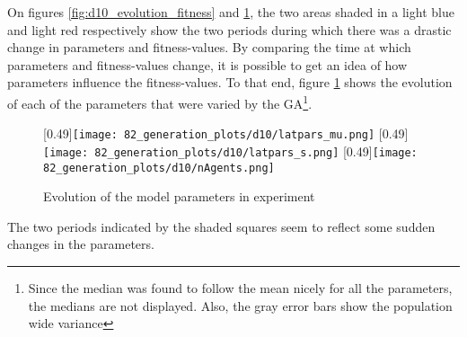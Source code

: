 On figures \ref{fig:d10_evolution_fitness} and \ref{fig:d10_evolution_parameters}, the two areas shaded in a light blue and light red respectively show the two periods during which there was a drastic change in parameters and fitness-values. By comparing the time at which parameters and fitness-values change, it is possible to get an idea of how parameters influence the fitness-values. To that end, figure \ref{fig:d10_evolution_parameters} shows the evolution of each of the parameters that were varied by the GA\footnote{Since the median was found to follow the mean nicely for all the parameters, the medians are not displayed. Also, the gray error bars show the population wide variance}.
\begin{figure}
	\centering
	[0.49\linewidth]{\texttt{[image: 82\_generation\_plots/d10/latpars\_mu.png]}}
	[0.49\linewidth]{\texttt{[image: 82\_generation\_plots/d10/latpars\_s.png]}}
	\vspace{0.5cm}
	[0.49\linewidth]{\texttt{[image: 82\_generation\_plots/d10/nAgents.png]}}
	\caption{Evolution of the model parameters in experiment \dten}
	\label{fig:d10_evolution_parameters}
\end{figure}

The two periods indicated by the shaded squares seem to reflect some sudden changes in the parameters.

